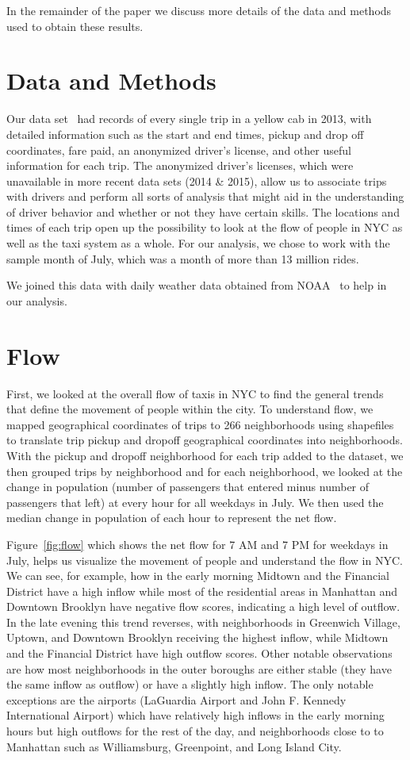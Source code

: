 \documentclass[twocolumn]{article}
\begin{document}
In the remainder of the paper we discuss more details of the data and methods used to obtain these results.

\section{Data and Methods}
Our data set~\cite{WHONG:2014} had records of every single trip in a yellow cab in 2013, with detailed information such as the start and end times, pickup and drop off coordinates, fare paid, an anonymized driver's license, and other useful information for each trip. The anonymized driver's licenses, which were unavailable in more recent data sets (2014 \& 2015), allow us to associate trips with drivers and perform all sorts of analysis that might aid in the understanding of driver behavior and whether or not they have certain skills. The locations and times of each trip open up the possibility to look at the flow of people in NYC as well as the taxi system as a whole. For our analysis, we chose to work with the sample month of July, which was a month of more than 13 million rides. 
 
We joined this data with daily weather data obtained from NOAA~\cite{NOAA:2016} to help in our analysis. 
\section{Flow}
First, we looked at the overall flow of taxis in NYC to find the general trends that define the movement of people within the city. To understand flow, we mapped geographical coordinates of trips to 266 neighborhoods using shapefiles~\cite{PEDIACITIES:2015} to translate trip pickup and dropoff geographical coordinates into neighborhoods. With the pickup and dropoff neighborhood for each trip added to the dataset, we then grouped trips by neighborhood and for each neighborhood, we looked at the change in population (number of passengers that entered minus number of passengers that left) at every hour for all weekdays in July. We then used the median change in population of each hour to represent the net flow.

Figure~\ref{fig:flow} which shows the net flow for 7 AM and 7 PM for weekdays in July, helps us visualize the movement of people and understand the flow in NYC. We can see, for example, how in the early morning Midtown and the Financial District have a high inflow while most of the residential areas in Manhattan and Downtown Brooklyn have negative flow scores, indicating a high level of outflow. In the late evening this trend reverses, with neighborhoods in Greenwich Village, Uptown, and Downtown Brooklyn receiving the highest inflow, while Midtown and the Financial District have high outflow scores. Other notable observations are how most neighborhoods in the outer boroughs are either stable (they have the same inflow as outflow) or have a slightly high inflow. The only notable exceptions are the airports (LaGuardia Airport and John F. Kennedy International Airport) which have relatively high inflows in the early morning hours but high outflows for the rest of the day, and neighborhoods close to to Manhattan such as Williamsburg, Greenpoint, and Long Island City.
\end{document}
